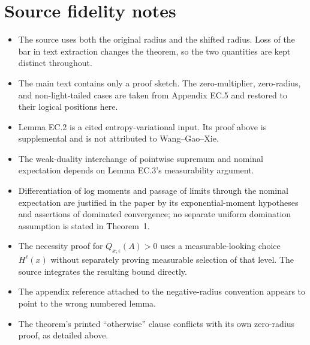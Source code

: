 \section*{Source fidelity notes}
\begin{itemize}[leftmargin=2em]
\item The source uses both the original radius and the shifted radius.  Loss of the bar in text extraction changes the theorem, so the two quantities are kept distinct throughout.
\item The main text contains only a proof sketch.  The zero-multiplier, zero-radius, and non-light-tailed cases are taken from Appendix EC.5 and restored to their logical positions here.
\item Lemma EC.2 is a cited entropy-variational input.  Its proof above is supplemental and is not attributed to Wang--Gao--Xie.
\item The weak-duality interchange of pointwise supremum and nominal expectation depends on Lemma EC.3's measurability argument.
\item Differentiation of log moments and passage of limits through the nominal expectation are justified in the paper by its exponential-moment hypotheses and assertions of dominated convergence; no separate uniform domination assumption is stated in Theorem~1.
\item The necessity proof for $Q_{x,\epsilon}(A)>0$ uses a measurable-looking choice $H^\ell(x)$ without separately proving measurable selection of that level.  The source integrates the resulting bound directly.
\item The appendix reference attached to the negative-radius convention appears to point to the wrong numbered lemma.
\item The theorem's printed ``otherwise'' clause conflicts with its own zero-radius proof, as detailed above.
\end{itemize}



